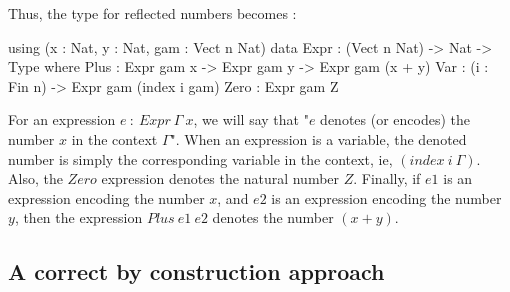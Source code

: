 \documentclass{sigplanconf}
\begin{document}
Thus, the type for reflected numbers becomes :
\begin{code}[caption=Second version of reflected number with embedded denotation, captionpos=b, label=lst1:haskell2]
using (x : Nat, y : Nat, gam : Vect n Nat)
  data Expr : (Vect n Nat) -> Nat 
               -> Type where
       Plus : Expr gam x -> Expr gam y -> 
              Expr gam (x + y)
       Var  : (i : Fin n) -> 
              Expr gam (index i gam)
       Zero : Expr gam Z
\end{code}
For an expression $e\ :\ Expr\ \Gamma\ x$, we will say that "$e$ denotes (or encodes) the number $x$ in the context $\Gamma$".
When an expression is a variable, the denoted number is simply the corresponding variable in the context, ie, $(index\ i\ \Gamma)$.
Also, the $Zero$ expression denotes the natural number $Z$.
Finally, if $e1$ is an expression encoding the number $x$, and $e2$ is an expression encoding the number $y$, then the expression $Plus\ e1\ e2$ denotes the number $(x + y)$.

\subsection{A correct by construction approach}
\end{document}
